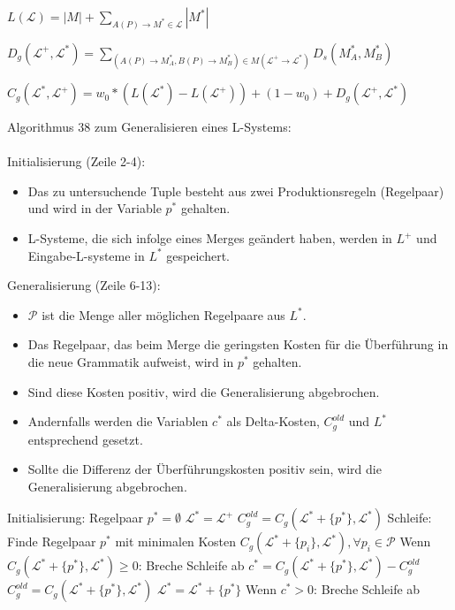\begin{algorithm}[caption={Längenfunktion $L$ für Grammatiken}]
$L(\mathcal{L}) = |M| + \sum\limits_{A(P) \rightarrow M^* \in \mathcal{L}} |M^*|$
\end{algorithm}

\begin{algorithm}[caption={Grammar Edit Distance}]
$D_g(\mathcal{L}^+, \mathcal{L}^*)= \sum\limits_{(A(P) \rightarrow M^*_A , B(P) \rightarrow M^*_B) \in M(\mathcal{L^+} \rightarrow \mathcal{L^*})} D_s(M^*_A, M^*_B)$
\end{algorithm}

\begin{algorithm}[caption={Kostenfunktion $C_g$ mit Gewichtung $w_0$}]
$C_g(\mathcal{L}^*, \mathcal{L}^+) = w_0 * (L(\mathcal{L}^*) - L(\mathcal{L}^+)) + (1 - w_0) + D_g(\mathcal{L}^+, \mathcal{L}^*)$
\end{algorithm}

\newpage

Algorithmus 38 zum Generalisieren eines L-Systems:\\~\\
Initialisierung (Zeile 2-4):
\begin{itemize}
    \item Das zu untersuchende Tuple besteht aus zwei Produktionsregeln (Regelpaar) und wird in der Variable $p^*$ gehalten.
    \item L-Systeme, die sich infolge eines Merges geändert haben, werden in $L^+$ und Eingabe-L-systeme in $L^*$ gespeichert.
\end{itemize}
Generalisierung (Zeile 6-13):
\begin{itemize}
    \item $\mathcal{P}$ ist die Menge aller möglichen Regelpaare aus $L^*$.
    \item Das Regelpaar, das beim Merge die geringsten Kosten für die Überführung in die neue Grammatik aufweist, wird in
    $p^*$ gehalten.
    \item Sind diese Kosten positiv, wird die Generalisierung abgebrochen.
    \item Andernfalls werden die Variablen $c^*$ als Delta-Kosten, $C^{old}_g$ und $L^*$ entsprechend gesetzt.
    \item Sollte die Differenz der Überführungskosten positiv sein, wird die Generalisierung abgebrochen.
\end{itemize}

\begin{algorithm}[caption={Generalisieren eines L-Systems mit Gewichtung $w_0$}]
Initialisierung:
    Regelpaar $p^* = \emptyset$
    $\mathcal{L}^* = \mathcal{L}^+$
    $C_g^{old} = C_g(\mathcal{L}^* + \{p^*\}, \mathcal{L}^*)$
Schleife:
    Finde Regelpaar $p^*$ mit minimalen Kosten $C_g(\mathcal{L}^* + \{p_i\}, \mathcal{L}^*), \forall p_i \in \mathcal{P}$
    Wenn $C_g(\mathcal{L}^* + \{p^*\}, \mathcal{L}^*) \geq 0$:
        Breche Schleife ab
    $c^* = C_g(\mathcal{L}^* + \{p^*\}, \mathcal{L}^*) - C_g^{old}$
    $C_g^{old} = C_g(\mathcal{L}^* + \{p^*\}, \mathcal{L}^*)$
    $\mathcal{L}^* = \mathcal{L}^* + \{p^*\}$
    Wenn $c^* > 0$:
        Breche Schleife ab
\end{algorithm}

